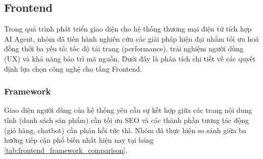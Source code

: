 \subsection{Frontend}
Trong quá trình phát triển giao diện cho hệ thống thương mại điện tử tích hợp AI Agent, nhóm đã tiến hành nghiên cứu các giải pháp hiện đại nhằm tối ưu hoá đồng thời ba yếu tố: tốc độ tải trang (performance), trải nghiệm người dùng (UX) và khả năng bảo trì mã nguồn. Dưới đây là phân tích chi tiết về các quyết định lựa chọn công nghệ cho tầng Frontend.

\subsubsection{Framework}

Giao diện người dùng của hệ thống yêu cầu sự kết hợp giữa các trang nội dung tĩnh (danh sách sản phẩm) cần tối ưu SEO và các thành phần tương tác động (giỏ hàng, chatbot) cần phản hồi tức thì. Nhóm đã thực hiện so sánh giữa ba hướng tiếp cận phổ biến nhất hiện nay tại bảng \ref{tab:frontend_framework_comparison}.

